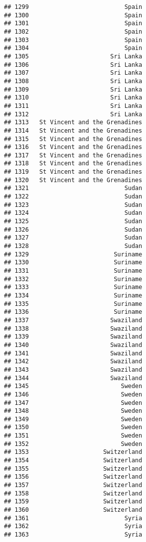 \documentclass[]{article}
\begin{document}
\begin{verbatim}
## 1299                           Spain
## 1300                           Spain
## 1301                           Spain
## 1302                           Spain
## 1303                           Spain
## 1304                           Spain
## 1305                       Sri Lanka
## 1306                       Sri Lanka
## 1307                       Sri Lanka
## 1308                       Sri Lanka
## 1309                       Sri Lanka
## 1310                       Sri Lanka
## 1311                       Sri Lanka
## 1312                       Sri Lanka
## 1313   St Vincent and the Grenadines
## 1314   St Vincent and the Grenadines
## 1315   St Vincent and the Grenadines
## 1316   St Vincent and the Grenadines
## 1317   St Vincent and the Grenadines
## 1318   St Vincent and the Grenadines
## 1319   St Vincent and the Grenadines
## 1320   St Vincent and the Grenadines
## 1321                           Sudan
## 1322                           Sudan
## 1323                           Sudan
## 1324                           Sudan
## 1325                           Sudan
## 1326                           Sudan
## 1327                           Sudan
## 1328                           Sudan
## 1329                        Suriname
## 1330                        Suriname
## 1331                        Suriname
## 1332                        Suriname
## 1333                        Suriname
## 1334                        Suriname
## 1335                        Suriname
## 1336                        Suriname
## 1337                       Swaziland
## 1338                       Swaziland
## 1339                       Swaziland
## 1340                       Swaziland
## 1341                       Swaziland
## 1342                       Swaziland
## 1343                       Swaziland
## 1344                       Swaziland
## 1345                          Sweden
## 1346                          Sweden
## 1347                          Sweden
## 1348                          Sweden
## 1349                          Sweden
## 1350                          Sweden
## 1351                          Sweden
## 1352                          Sweden
## 1353                     Switzerland
## 1354                     Switzerland
## 1355                     Switzerland
## 1356                     Switzerland
## 1357                     Switzerland
## 1358                     Switzerland
## 1359                     Switzerland
## 1360                     Switzerland
## 1361                           Syria
## 1362                           Syria
## 1363                           Syria

\end{verbatim}
\end{document}
